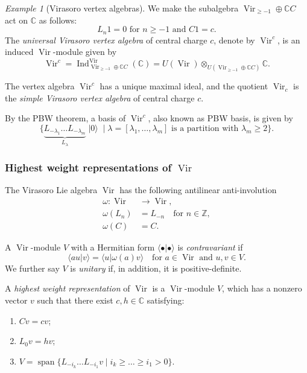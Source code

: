 \documentclass[notheorems]{beamer}
\theoremstyle{remark}
\newtheorem{example}{Example}
\DeclareMathOperator{\Vir}{Vir}
\DeclareMathOperator{\vspan}{span}
\DeclareMathOperator{\Ind}{Ind}
\DeclareMathOperator{\vac}{|0\rangle}
\begin{document}
\begin{frame}
  \begin{example}[Virasoro vertex algebras]
    \label{exa:3}
    We make the subalgebra $\Vir_{\ge -1} \oplus \mathbb{C}C$ act on $\mathbb{C}$ as follows:
    \begin{equation*}
      \text{$L_n1 = 0$ for $n \ge -1$ and $C1 = c$}.
    \end{equation*}
    The \emph{universal Virasoro vertex algebra} of central charge $c$, denote by $\Vir^c$, is an induced $\Vir$-module given by
    \begin{equation*}
      \Vir^c = \Ind^{\Vir}_{\Vir_{\ge -1} \oplus \mathbb{C}C}(\mathbb{C}) = U(\Vir) \otimes_{U(\Vir_{\ge -1} \oplus \mathbb{C}C)} \mathbb{C}.
    \end{equation*}

    The vertex algebra $\Vir^c$ has a unique maximal ideal, and the quotient $\Vir_c$ is the \emph{simple Virasoro vertex algebra} of central charge $c$.

    By the PBW theorem, a basis of $\Vir^c$, also known as PBW basis, is given by
    \begin{equation*}
      \{\underbrace{L_{-\lambda_1}\dots L_{-\lambda_m}}_{L_{\lambda}}\vac \mid \text{$\lambda = [\lambda_1, \dots, \lambda_m]$ is a partition with $\lambda_m \ge 2$}\}.
    \end{equation*}
  \end{example}
\end{frame}

\begin{frame}
  \frametitle{Highest weight representations of $\Vir$}
  The Virasoro Lie algebra $\Vir$ has the following antilinear anti-involution
  \begin{align*}
    \omega: \Vir &\to \Vir, \\
    \omega(L_n) &= L_{-n} \quad \text{for $n \in \mathbb{Z}$}, \\
    \omega(C) &= C.
  \end{align*}

  A $\Vir$-module $V$ with a Hermitian form $\langle\bullet| \bullet\rangle$ is \emph{contravariant} if
  \begin{equation*}
    \langle au| v\rangle = \langle u| \omega(a)v\rangle \quad \text{for $a \in \Vir$ and $u, v \in V$}.
  \end{equation*}
  We further say $V$ is \emph{unitary} if, in addition, it is positive-definite.

  A \emph{highest weight representation} of $\Vir$ is a $\Vir$-module $V$, which has a nonzero vector $v$ such that there exist $c, h \in \mathbb{C}$ satisfying:
  \begin{enumerate}
  \item $Cv = cv$;
  \item $L_0v = hv$;
  \item $V = \vspan\{L_{-i_k}\dots L_{-i_1}v \mid i_k \ge \dots \ge i_1 > 0\}$.
  \end{enumerate}
\end{frame}
\end{document}
